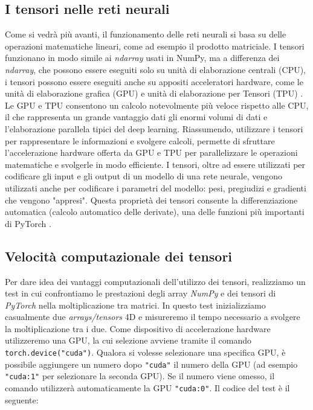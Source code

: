\subsection{I tensori nelle reti neurali}
Come si vedrà più avanti, il funzionamento delle reti neurali si basa 
su delle operazioni matematiche lineari, come ad esempio il prodotto matriciale. 
I tensori funzionano in modo simile ai \textit{ndarray} usati in NumPy, ma a 
differenza dei \textit{ndarray}, che possono essere eseguiti solo su unità 
di elaborazione centrali (CPU), i tensori possono essere eseguiti anche
su appositi acceleratori hardware, come le unità di elaborazione grafica (GPU) e 
unità di elaborazione per Tensori (TPU) .
Le GPU e TPU consentono un calcolo notevolmente più veloce rispetto alle CPU, 
il che rappresenta un grande vantaggio dati gli enormi volumi di dati e 
l'elaborazione parallela tipici del deep learning.
Riassumendo, utilizzare i tensori per rappresentare le informazioni e 
svolgere calcoli, permette di sfruttare l'accelerazione hardware 
offerta da GPU e TPU per parallelizzare le operazioni matematiche e 
svolgerle in modo efficiente.
I tensori, oltre ad essere utilizzati per codificare gli input e gli output 
di un modello di una rete neurale, vengono utilizzati anche per 
codificare i parametri del modello: pesi, pregiudizi e gradienti che 
vengono "appresi". 
Questa proprietà dei tensori consente la differenziazione automatica 
(calcolo automatico delle derivate), una delle funzioni più importanti 
di PyTorch \cite{Tensore_Fidacaro,Tensore_IBM,tensor_analytic,tensor_medium1,tensor_medium2,tensor_strano}.

\subsection{Velocità computazionale dei tensori}
Per dare idea dei vantaggi computazionali dell'utilizzo dei tensori, 
realizziamo un test in cui confrontiamo le prestazioni degli array \textit{NumPy}
e dei tensori di \textit{PyTorch} nella moltiplicazione tra matrici.
In questo test inizializziamo casualmente  due \textit{arrays/tensors} 4D
e misureremo il tempo necessario a svolgere la moltiplicazione tra i due.
Come dispositivo di accelerazione hardware utilizzeremo una GPU, la cui 
selezione avviene tramite il comando \texttt{torch.device("cuda")}.
Qualora si volesse selezionare una specifica GPU, è possibile aggiungere un numero dopo 
\texttt{"cuda"} il numero della GPU (ad esempio \texttt{"cuda:1"} per selezionare la 
seconda GPU). Se il numero viene omesso, il comando utilizzerà automaticamente 
la GPU \texttt{"cuda:0"}. Il codice del test è il seguente:

